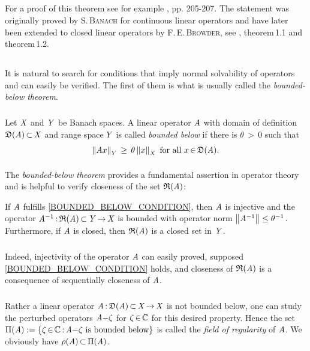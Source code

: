 \documentclass[11pt,twoside]{article}
\begin{document}
\subparagraph{}
For a proof of this theorem see for example \cite{Yo}, pp. 205-207.
The statement was originally proved by \textsc{S.\,Banach}
for continuous linear operators and
have later been extended to closed linear operators by \textsc{F.\,E.\,Browder},
see \cite{Br1}, theorem\,1.1 and theorem\,1.2.

\subsection{} %
It is natural to search for conditions
that imply normal solvability of operators and can easily be verified.
The first of them is what is usually called the \textit{bounded-below theorem}.

\subparagraph{} %
Let $\mathit{X}$ and $\mathit{Y}$ be Banach spaces.
A linear operator $\mathit{A}$
with domain of definition $\mathfrak{D}(\mathit{A}) {\,\subset\,} \mathit{X}$
and range space\,$\mathit{Y}$ is called \textit{bounded below}
if there is $\theta {\,>\,} 0$ such that
\begin{equation}\label{BOUNDED_BELOW_CONDITION}
\left\lVert \mathit{A} x \right\rVert_Y \, \geq \, \theta \left\lVert x \right\rVert_{\mathit{X}} \mbox{ for all } x {\,\in\,} \mathfrak{D}(\mathit{A}).
\end{equation}

\paragraph{} %
The \textit{bounded-below theorem} provides a fundamental assertion
in operator theory
and is helpful to verify closeness of the set $\mathfrak{R}(\mathit{A})$:

\begin{theorem}\label{BOUNDED_BELOW_THEOREM}
If $\mathit{A}$ fulfills \eqref{BOUNDED_BELOW_CONDITION},
then $\mathit{A}$ is injective and the operator
$\mathit{A}^{-1} {\,:\,} \mathfrak{R}(\mathit{A}) {\,\subset\,} \mathit{Y} {\,\to\,} \mathit{X}$ is bounded
with operator norm $\left\lVert \mathit{A}^{-1} \right\rVert \leq \theta^{-1}$.
Furthermore,
if $\mathit{A}$ is closed,
then $\mathfrak{R}(\mathit{A})$ is a closed set in $\mathit{Y}$.
\end{theorem}

\subparagraph{} %
Indeed,
injectivity of the operator $\mathit{A}$ can easily proved,
supposed \eqref{BOUNDED_BELOW_CONDITION} holds,
and closeness of $\mathfrak{R}(\mathit{A})$ is a consequence of sequentially closeness
of $\mathit{A}$.

\subparagraph{} %
Rather a linear operator $\mathit{A} {\,:\,} \mathfrak{D}(\mathit{A}) {\,\subset\,} \mathit{X} {\,\to\,} \mathit{X}$
is not bounded below,
one can study the perturbed operators $\mathit{A}{-}\zeta$ for $\zeta {\,\in\,} {\mathbb{C}}$
for this desired property.
Hence the set
$\Pi(\mathit{A}) := \{ \zeta {\,\in\,} {\mathbb{C}} {\,:\,} \mathit{A}{-}\zeta \mbox{ is bounded below}\}$
is called the \textit{field of regularity} of $\mathit{A}$.
We obviously have $\rho(\mathit{A}) {\,\subset\,} \Pi(\mathit{A})$.
\end{document}
